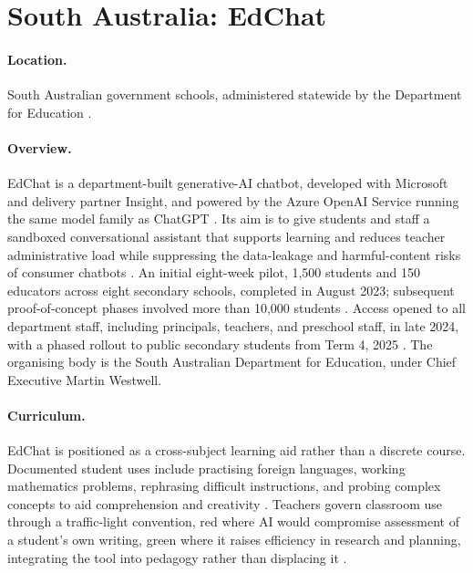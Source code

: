 
\section{South Australia: EdChat}
\label{sec:ai:edchat}

\paragraph{Location.}
South Australian government schools, administered statewide by the Department for
Education \autocite{educationSAEdChat2025}.

\paragraph{Overview.}
EdChat is a department-built generative-AI chatbot, developed with Microsoft and
delivery partner Insight, and powered by the Azure OpenAI Service running the same
model family as ChatGPT \autocite{microsoftEdChatContentSafety2024}. Its aim is to
give students and staff a sandboxed conversational assistant that supports learning
and reduces teacher administrative load while suppressing the data-leakage and
harmful-content risks of consumer chatbots \autocite{educationSAEdChat2025}. An
initial eight-week pilot, 1,500 students and 150 educators across eight secondary
schools, completed in August 2023; subsequent proof-of-concept phases involved more
than 10,000 students \autocite{microsoftEdChatContentSafety2024}. Access opened to
all department staff, including principals, teachers, and preschool staff, in late
2024, with a phased rollout to public secondary students from Term 4, 2025
\autocite{innovationausEdChatStatewide2025}. The organising body is the South
Australian Department for Education, under Chief Executive Martin Westwell.

\paragraph{Curriculum.}
EdChat is positioned as a cross-subject learning aid rather than a discrete course.
Documented student uses include practising foreign languages, working mathematics
problems, rephrasing difficult instructions, and probing complex concepts to aid
comprehension and creativity \autocite{microsoftLearningAIEra2024}. Teachers govern
classroom use through a traffic-light convention, red where AI would compromise
assessment of a student's own writing, green where it raises efficiency in research
and planning, integrating the tool into pedagogy rather than displacing it
\autocite{educationSAEdChat2025}.


